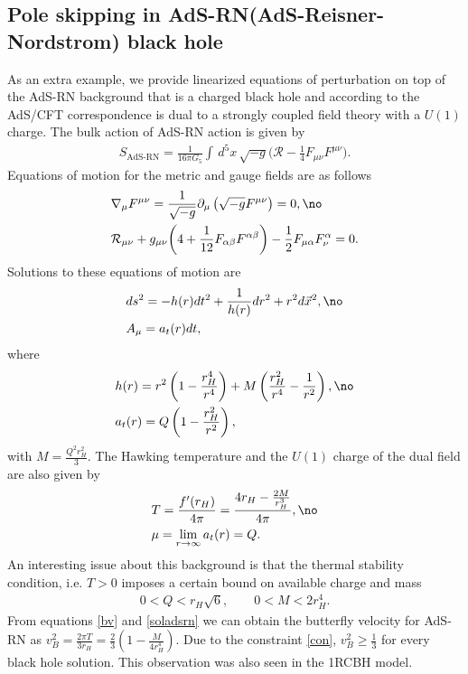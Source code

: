 \documentclass[preprintnumbers,aps,prd,longbibliography,nofootinbib,nobibnotes,amsmath,amssymb]{revtex4}
\begin{document}
\subsection{ Pole skipping in AdS-RN(AdS-Reisner-Nordstrom) black hole}
As an extra example, we provide linearized equations of perturbation on top of the AdS-RN background that is a charged black hole and according to the AdS/CFT correspondence is dual to a strongly coupled field theory with a $U(1)$ charge. The bulk action of AdS-RN action is given by
\begin{align}
	S_{\textrm{AdS-RN}} = \frac{1}{16 \pi G_5} \int\, d^5x\, \sqrt{-g} \bigg(\mathcal{R} - \frac{1}{4} F_{\mu \nu} F^{\mu \nu}\bigg).
\end{align}
Equations of motion for the metric and gauge fields are as follows
\begin{align}
	&\nabla_{\mu} F^{\mu \nu} = \frac{1}{\sqrt{-g}} \partial_\mu \left(\sqrt{-g} F^{\mu \nu}\right)= 0, \no\\
	& \mathcal{R}_{\mu \nu} +  g_{\mu \nu} \bigg(4 + \frac{1}{12} F_{\alpha \beta} F^{\alpha \beta}\bigg) - \frac{1}{2} F_{\mu \alpha} F_{\nu}^\alpha = 0.
\end{align}
Solutions to these equations of motion are 
\begin{align}\label{soladsrn}
	&ds^2 = - h(r) dt^2 + \frac{1}{h(r)} dr^2 + r^2 d\vec{x}^2,\no\\
	&A_\mu = a_t(r) dt,
\end{align}
where
\begin{align}
	&h(r) = r^2 \left(1 - \frac{r_H^4}{r^4}\right) + M \left(\frac{r_H^2}{r^4} - \frac{1}{r^2}\right),\no\\
	&a_t(r) =  Q\left(1 - \frac{r_H^2}{r^2} \right),
\end{align}
with $M = \frac{Q^2 r_H^2}{3}$. The Hawking temperature  and the $U(1)$ charge of the dual field are also given by
\begin{align}
	&T = \frac{f'(r_H)}{4\pi} = \frac{4 r_H - \frac{2 M}{r_H^3}}{4 \pi},\no\\
	&\mu = \lim\limits_{r \to \infty} a_t(r) = Q.
\end{align} 
An interesting issue about this background is that the thermal stability condition, i.e. $T > 0$ imposes a certain bound on available charge and mass
\begin{align}\label{con}
	0 < Q < r_H\sqrt{6}, \qquad 0 < M < 2 r_H^4.
\end{align}
From equations \eqref{bv} and \eqref{soladsrn} we can obtain  the butterfly velocity for AdS-RN as $v_B^2 = \frac{2 \pi T}{3 r_H} = \frac{2}{3} \left(1 - \frac{M}{4 r_H^4}\right)$. Due to the constraint \eqref{con}, $v_B^2 \geq \frac{1}{3}$ for every black hole solution. This observation was also seen in the 1RCBH model.
\end{document}
